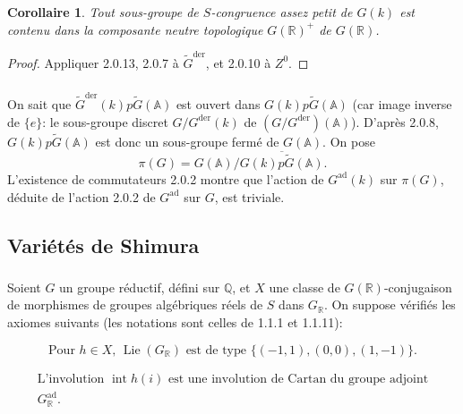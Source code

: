 \documentclass[12pt,a4paper]{article}
\theoremstyle{plain}
\newtheorem{corollary}[theorem]{Corollaire}
\theoremstyle{definition}
\theoremstyle{remark}
\DeclareMathOperator{\Lie}{Lie}
\DeclareMathOperator{\Int}{int}
\newcommand{\QQ}{\mathbb{Q}}
\newcommand{\RR}{\mathbb{R}}
\newcommand{\A}{\mathbb{A}}
\begin{document}
\begin{corollary}
Tout sous-groupe de $S$-congruence assez petit de $G(k)$ est contenu dans la composante neutre topologique $G(\RR)^+$ de $G(\RR)$.
\end{corollary}

\begin{proof}
Appliquer 2.0.13, 2.0.7 \`a $\tilde{G}^{\text{der}}$, et 2.0.10 \`a $Z^0$.
\end{proof}

\subsubsection{}

On sait que $\tilde{G}^{\text{der}}(k)p\tilde{G}(\A)$ est ouvert dans $G(k)p\tilde{G}(\A)$ (car image inverse de $\{e\}$: le sous-groupe discret $G/G^{\text{der}}(k)$ de $(G/G^{\text{der}})(\A)$). D'apr\`es 2.0.8, $G(k)p\tilde{G}(\A)$ est donc un sous-groupe ferm\'e de $G(\A)$. On pose
\begin{equation}\label{eq:2.0.15.1}
\pi(G) = G(\A)/\overline{G(k)p\tilde{G}(\A)}.
\end{equation}
L'existence de commutateurs 2.0.2 montre que l'action de $G^{\text{ad}}(k)$ sur $\pi(G)$, d\'eduite de l'action 2.0.2 de $G^{\text{ad}}$ sur $G$, est triviale.

\subsection{Vari\'et\'es de Shimura}

\subsubsection{}

Soient $G$ un groupe r\'eductif, d\'efini sur $\QQ$, et $X$ une classe de $G(\RR)$-conjugaison de morphismes de groupes alg\'ebriques r\'eels de $S$ dans $G_{\RR}$. On suppose v\'erifi\'es les axiomes suivants (les notations sont celles de 1.1.1 et 1.1.11):

\begin{equation}\label{eq:2.1.1.1}
\text{Pour } h \in X \text{, } \Lie(G_{\RR}) \text{ est de type } \{(-1,1),(0,0),(1,-1)\}.
\end{equation}

\begin{equation}\label{eq:2.1.1.2}
\begin{array}{l}
\text{L'involution } \Int h(i) \text{ est une involution de Cartan du groupe adjoint}\\
G^{\text{ad}}_{\RR}.
\end{array}
\end{equation}
\end{document}
